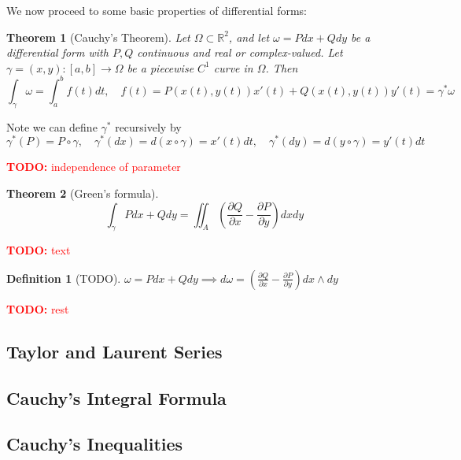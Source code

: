 \documentclass{article}
\newtheorem{theorem}{Theorem}
\newcommand{\mbb}[1]{\mathbb{#1}}
\newcommand{\prt}[2]{{\frac{\partial {#1}}{\partial {#2}}}}
\newcommand{\reals}{\mbb{R}}
\newtheorem{definition}{Definition}
\newcommand{\TODO}[1]{\begin{center}\huge{\textcolor{red}{\textbf{TODO:} #1}}\end{center}}
\begin{document}
We now proceed to some basic properties of differential forms:
\begin{theorem}[Cauchy's Theorem]
Let \(\Omega \subset \reals^2\), and let \(\omega = Pdx + Qdy\) be a differential form with \(P, Q\) continuous and real or complex-valued. Let \(\gamma = (x, y): [a, b] \to \Omega\) be a piecewise \(C^1\) curve in \(\Omega\). Then
\[\int_\gamma\omega = \int_a^bf(t)dt, \quad f(t) = P(x(t), y(t))x'(t) + Q(x(t), y(t))y'(t) = \gamma^*\omega\]
\end{theorem}
Note we can define \(\gamma^*\) recursively by
\[\gamma^*(P) = P\circ \gamma, \quad \gamma^*(dx) = d(x \circ \gamma) = x'(t)dt, \quad \gamma^*(dy) = d(y \circ \gamma) = y'(t)dt\]

\TODO{independence of parameter}

\begin{theorem}[Green's formula]
\[\int_\gamma Pdx + Qdy = \iint_A\left(\prt{Q}{x} - \prt{P}{y}\right)dxdy\]
\end{theorem}

\TODO{text}

\begin{definition}[TODO]
\(\omega = Pdx + Qdy \implies d\omega = \left(\prt{Q}{x} - \prt{P}{y}\right)dx \wedge dy\)
\end{definition}

\TODO{rest}

\subsection{Taylor and Laurent Series}

\subsection{Cauchy's Integral Formula}

\subsection{Cauchy's Inequalities}
\end{document}
